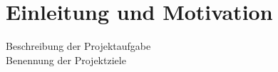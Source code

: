 \chapter{Einleitung und Motivation}
\label{introduction-and-motivation}

Beschreibung der Projektaufgabe\\

Benennung der Projektziele\\
